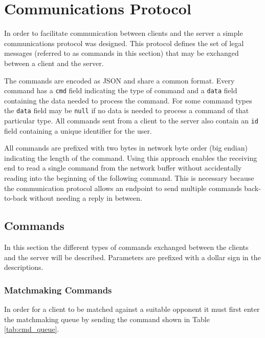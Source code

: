 \section{Communications Protocol}
In order to facilitate communication between clients and the server a simple communications protocol was designed.
This protocol defines the set of legal messages (referred to as commands in this section) that may be exchanged between a client and the server.

The commands are encoded as JSON and share a common format.
Every command has a \texttt{cmd} field indicating the type of command and a \texttt{data} field containing the data needed to process the command.
For some command types the \texttt{data} field may be \texttt{null} if no data is needed to process a command of that particular type.
All commands sent from a client to the server also contain an \texttt{id} field containing a unique identifier for the user.

All commands are prefixed with two bytes in network byte order (big endian) indicating the length of the command.
Using this approach enables the receiving end to read a single command from the network buffer without accidentally reading into the beginning of the following command.
This is necessary because the communication protocol allows an endpoint to send multiple commands back-to-back without needing a reply in between.

\subsection{Commands}
In this section the different types of commands exchanged between the clients and the server will be described.
Parameters are prefixed with a dollar sign in the descriptions.

\subsubsection{Matchmaking Commands}
In order for a client to be matched against a suitable opponent it must first enter the matchmaking queue by sending the command shown in Table \ref{tab:cmd_queue}.

\newenvironment{command}
{\bigskip\begin{minipage}{\textwidth}\hrule\begin{description}}
{\end{description}\hrule\end{minipage}\bigskip}

